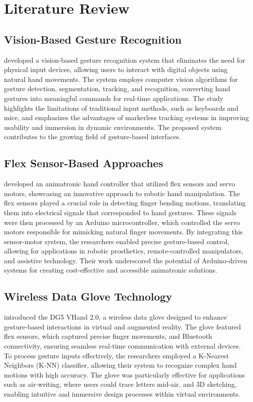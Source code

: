 \section{Literature Review}
\label{sec:literature}

\subsection{Vision-Based Gesture Recognition}
\citet{Rautaray2013} developed a vision-based gesture recognition system that eliminates the need for physical input devices, allowing users to interact with digital objects using natural hand movements. The system employs computer vision algorithms for gesture detection, segmentation, tracking, and recognition, converting hand gestures into meaningful commands for real-time applications. The study highlights the limitations of traditional input methods, such as keyboards and mice, and emphasizes the advantages of markerless tracking systems in improving usability and immersion in dynamic environments. The proposed system contributes to the growing field of gesture-based interfaces.

\subsection{Flex Sensor-Based Approaches}
\citet{Chowdhury2013} developed an animatronic hand controller that utilized flex sensors and servo motors, showcasing an innovative approach to robotic hand manipulation. The flex sensors played a crucial role in detecting finger bending motions, translating them into electrical signals that corresponded to hand gestures. These signals were then processed by an Arduino microcontroller, which controlled the servo motors responsible for mimicking natural finger movements. By integrating this sensor-motor system, the researchers enabled precise gesture-based control, allowing for applications in robotic prosthetics, remote-controlled manipulators, and assistive technology. Their work underscored the potential of Arduino-driven systems for creating cost-effective and accessible animatronic solutions.

\subsection{Wireless Data Glove Technology}
\citet{Kumar2012} introduced the DG5 VHand 2.0, a wireless data glove designed to enhance gesture-based interactions in virtual and augmented reality. The glove featured flex sensors, which captured precise finger movements, and Bluetooth connectivity, ensuring seamless real-time communication with external devices. To process gesture inputs effectively, the researchers employed a K-Nearest Neighbors (K-NN) classifier, allowing their system to recognize complex hand motions with high accuracy. The glove was particularly effective for applications such as air-writing, where users could trace letters mid-air, and 3D sketching, enabling intuitive and immersive design processes within virtual environments.

